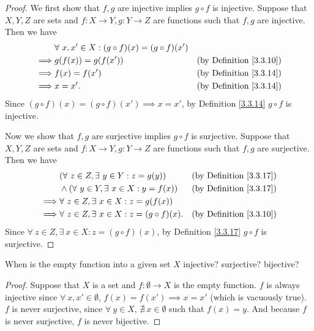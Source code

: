 \begin{proof}
We first show that \(f, g\) are injective implies \(g \circ f\) is injective.
Suppose that \(X, Y, Z\) are sets and \(f : X \to Y, g : Y \to Z\) are functions such that \(f, g\) are injective.
Then we have
\begin{align*}
& \forall\ x, x' \in X : (g \circ f)(x) = (g \circ f)(x') \\
\implies & g(f(x)) = g(f(x')) & \text{(by Definition \ref{3.3.10})} \\
\implies & f(x) = f(x') & \text{(by Definition \ref{3.3.14})} \\
\implies & x = x'. & \text{(by Definition \ref{3.3.14})}
\end{align*}
Since \((g \circ f)(x) = (g \circ f)(x') \implies x = x'\), by Definition \ref{3.3.14} \(g \circ f\) is injective.

Now we show that \(f, g\) are surjective implies \(g \circ f\) is surjective.
Suppose that \(X, Y, Z\) are sets and \(f : X \to Y, g : Y \to Z\) are functions such that \(f, g\) are surjective.
Then we have
\begin{align*}
& (\forall\ z \in Z, \exists\ y \in Y : z = g(y)) & \text{(by Definition \ref{3.3.17})} \\
& \land (\forall\ y \in Y, \exists\ x \in X : y = f(x)) & \text{(by Definition \ref{3.3.17})} \\
\implies & \forall\ z \in Z, \exists\ x \in X : z = g(f(x)) \\
\implies & \forall\ z \in Z, \exists\ x \in X : z = (g \circ f)(x). & \text{(by Definition \ref{3.3.10})}
\end{align*}
Since \(\forall\ z \in Z, \exists\ x \in X : z = (g \circ f)(x)\), by Definition \ref{3.3.17} \(g \circ f\) is surjective.
\end{proof}

\begin{exercise}\label{ex 3.3.3}
When is the empty function into a given set \(X\) injective?
surjective?
bijective?
\end{exercise}

\begin{proof}
Suppose that \(X\) is a set and \(f : \emptyset \to X\) is the empty function.
\(f\) is always injective since \(\forall\ x, x' \in \emptyset\), \(f(x) = f(x') \implies x = x'\) (which is vacuously true).
\(f\) is never surjective, since \(\forall\ y \in X\), \(\nexists\ x \in \emptyset\) such that \(f(x) = y\).
And because \(f\) is never surjective, \(f\) is never bijective.
\end{proof}

